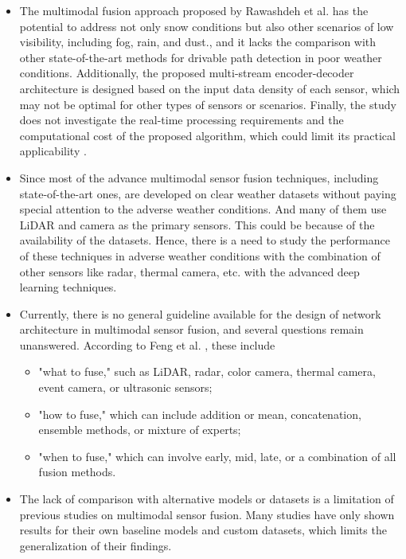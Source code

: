\documentclass[rnd]{mas_proposal}
\begin{document}
\begin{itemize}
      \item The multimodal fusion approach proposed by Rawashdeh et al. \cite{rawashdeh2021drivable} has the potential to address not only snow conditions but also other scenarios of low visibility, including fog, rain, and dust., and it lacks the comparison with other state-of-the-art methods for drivable path detection in poor weather conditions. Additionally, the proposed multi-stream encoder-decoder architecture is designed based on the input data density of each sensor, which may not be optimal for other types of sensors or scenarios. Finally, the study does not investigate the real-time processing requirements and the computational cost of the proposed algorithm, which could limit its practical applicability \cite{rawashdeh2021drivable}.

      \item Since most of the advance multimodal sensor fusion techniques, including state-of-the-art ones, are developed on clear weather datasets without paying special attention to the adverse weather conditions. And many of them use LiDAR and camera \cite{feng2020deep} as the primary sensors. This could be because of the availability of the datasets. Hence, there is a need to study the performance of these techniques in adverse weather conditions with the combination of other sensors like radar, thermal camera, etc. with the advanced deep learning techniques.
    
      \item Currently, there is no general guideline available for the design of network architecture in multimodal sensor fusion, and several questions remain unanswered. According to Feng et al. \cite{feng2020deep}, these include 
      \begin{itemize}
            \item "what to fuse," such as LiDAR, radar, color camera, thermal camera, event camera, or ultrasonic sensors; 
            \item "how to fuse," which can include addition or mean, concatenation, ensemble methods, or mixture of experts; 
            \item "when to fuse," which can involve early, mid, late, or a combination of all fusion methods.
      \end{itemize}

      \item The lack of comparison with alternative models or datasets is a limitation of previous studies on multimodal sensor fusion. Many studies have only shown results for their own baseline models and custom datasets, which limits the generalization of their findings.
      

\end{itemize}
\end{document}
